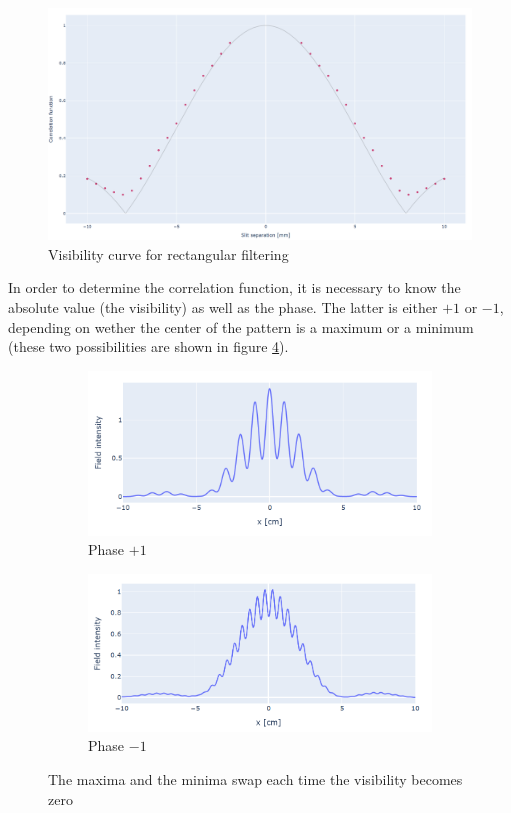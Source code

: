 \begin{figure}[!ht]
    \centering
    \includegraphics[width = \textwidth]{Img/vis.png}
    \caption{Visibility curve for rectangular filtering}
    \label{vis_f}
\end{figure}

In order to determine the correlation function, it is necessary to know the absolute value (the visibility) as well as the phase. The latter is either $+1$ or 
$-1$, depending on wether the center of the pattern is a maximum or a minimum (these two possibilities are shown in figure \ref{swap}). 

\begin{figure}[!ht]
    \centering
    \begin{subfigure}[]{0.49\textwidth}
        \includegraphics[width = \textwidth]{Img/patt_1.png}
        \caption{Phase $+1$}
        \label{patt-1}
    \end{subfigure}
    \hfill
    \begin{subfigure}[]{0.49\textwidth}
        \includegraphics[width = \textwidth]{Img/patt_2.png}
        \caption{Phase $-1$}
        \label{patt-2}
    \end{subfigure}
    \caption{The maxima and the minima swap each time the visibility becomes zero}
    \label{swap}
\end{figure}

